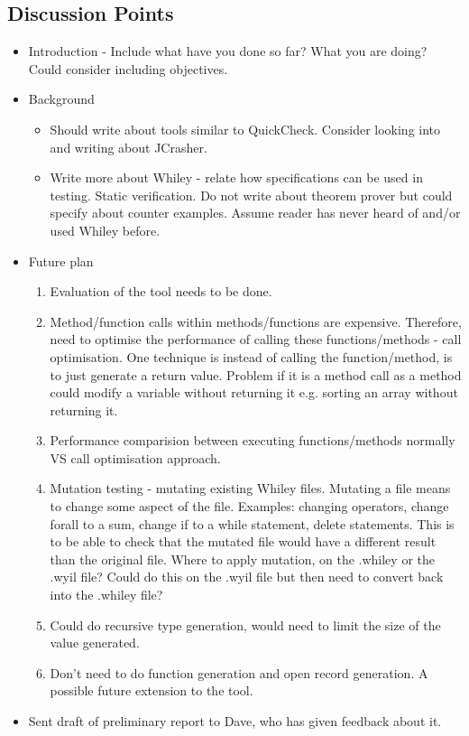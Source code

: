 \documentclass[]{article}
\begin{document}
\subsection{Discussion Points}
\begin{itemize}
	\item Introduction - Include what have you done so far? What you are doing? Could consider including objectives.
	\item Background 
	\begin{itemize}
		\item Should write about tools similar to QuickCheck. Consider looking into and writing about JCrasher.
		\item Write more about Whiley - relate how specifications can be used in testing. Static verification. Do not write about theorem prover but could specify about counter examples. Assume reader has never heard of and/or used Whiley before. 
	\end{itemize}
	\item Future plan
	\begin{enumerate}
		\item Evaluation of the tool needs to be done.
		\item Method/function calls within methods/functions are expensive. Therefore, need to optimise the performance of calling these functions/methods - call optimisation. One technique is instead of calling the function/method, is to just generate a return value. Problem if it is a method call as a method could modify a variable without returning it e.g. sorting an array without returning it.
		\item Performance comparision between executing functions/methods normally VS call optimisation approach.
		\item Mutation testing - mutating existing Whiley files. Mutating a file means to change some aspect of the file. Examples: changing operators, change forall to a sum, change if to a while statement, delete statements. This is to be able to check that the mutated file would have a different result than the original file. Where to apply mutation, on the .whiley or the .wyil file? Could do this on the .wyil file but then need to convert back into the .whiley file? 
		\item Could do recursive type generation, would need to limit the size of the value generated.
		\item Don't need to do function generation and open record generation. A possible future extension to the tool.
	\end{enumerate} 
	\item Sent draft of preliminary report to Dave, who has given feedback about it.
\end{itemize}
\end{document}
